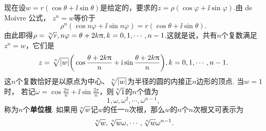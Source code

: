现在设$w=r(\cos\theta+\ii\sin\theta)$是给定的，要求的$z=\rho(\cos\varphi+\ii\sin\varphi)$.由 de Moivre 公式， $z^n=w$等价于
\[
  \rho^n( \cos n\varphi + \ii\sin n\varphi) = r(\cos \theta + \ii\sin\theta).
\]
由此即得$\rho=\sqrt[\leftroot{-1}\uproot{2} n]r,n\varphi=\theta+2k\pi,k=0,1,\cdots,n-1$.这就是说，共有$n$个复数满足$z^n=w$，它们是
\[
  z = \sqrt[\leftroot{-1}\uproot{2} n]{|w|}\bigg( \cos\frac{\theta + 2k\pi}n + \ii\sin\frac{\theta + 2k\pi}n \bigg), k = 0,1,\cdots,n-1.
\]
这$n$个复数恰好是以原点为中心、$\sqrt[\leftroot{-1}\uproot{2} n]{|w|}$为半径的圆的内接正$n$边形的顶点. 当$w=1$时， 若记$\omega=\cos\frac{2\pi}n+\ii\sin\frac{2\pi}n$，则$\sqrt[\leftroot{-1}\uproot{2} n]1$的$n$个值为
\[
  1,\omega,\omega^2,\cdots,\omega^{n-1},
\]
称为$n$个\textbf{单位根}. 如果用$\sqrt[\leftroot{-1}\uproot{2} n]{w}$记$w$的任一$n$次根，那么$w$的$n$个$n$次根又可表示为
\[
  \sqrt[\leftroot{-1}\uproot{2} n]w,\sqrt[\leftroot{-1}\uproot{2} n]w\omega,\cdots,\sqrt[\leftroot{-1}\uproot{2} n]{w}\omega^{n-1}.
\]

